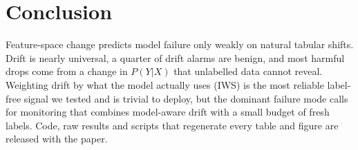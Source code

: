 \documentclass[conference]{IEEEtran}
\theoremstyle{plainhead}
\newcommand{\iws}{\textsc{IWS}}
\begin{document}
\section{Conclusion}
Feature-space change predicts model failure only weakly on natural tabular shifts. Drift is nearly universal, a quarter of drift alarms are benign, and most harmful drops come from a change in $P(Y|X)$ that unlabelled data cannot reveal. Weighting drift by what the model actually uses (\iws{}) is the most reliable label-free signal we tested and is trivial to deploy, but the dominant failure mode calls for monitoring that combines model-aware drift with a small budget of fresh labels. Code, raw results and scripts that regenerate every table and figure are released with the paper.
\end{document}
